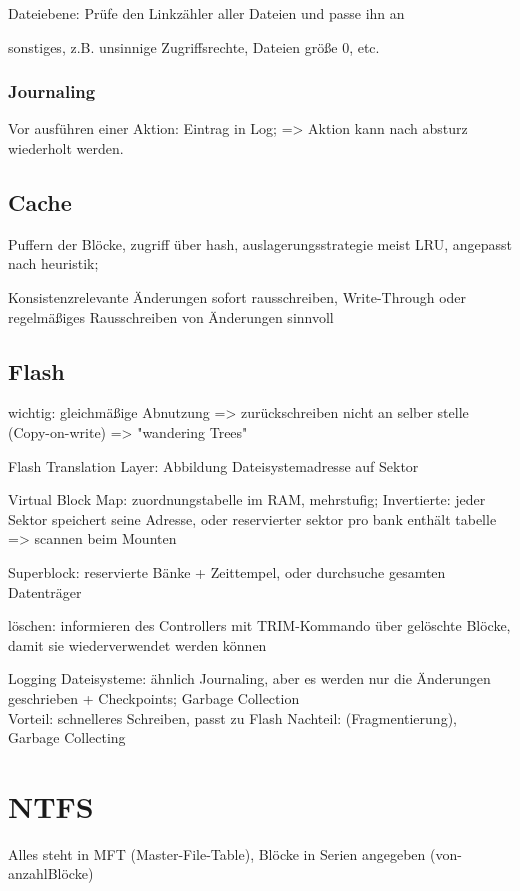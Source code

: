Dateiebene: Prüfe den Linkzähler aller Dateien und passe ihn an

sonstiges, z.B. unsinnige Zugriffsrechte, Dateien größe 0, etc.

\subsubsection*{Journaling}
Vor ausführen einer Aktion: Eintrag in Log; => Aktion kann nach absturz wiederholt werden.

\subsection*{Cache}
Puffern der Blöcke, zugriff über hash, auslagerungsstrategie meist LRU, angepasst nach heuristik;

Konsistenzrelevante Änderungen sofort rausschreiben, Write-Through oder regelmäßiges Rausschreiben von Änderungen sinnvoll

\subsection*{Flash}
wichtig: gleichmäßige Abnutzung => zurückschreiben nicht an selber stelle (Copy-on-write) => "wandering Trees"

Flash Translation Layer: Abbildung Dateisystemadresse auf Sektor

Virtual Block Map:  zuordnungstabelle im RAM, mehrstufig; 
Invertierte: jeder Sektor speichert seine Adresse, oder reservierter sektor pro bank enthält tabelle => scannen beim Mounten

Superblock: reservierte Bänke + Zeittempel, oder durchsuche gesamten Datenträger

löschen: informieren des Controllers mit TRIM-Kommando über gelöschte Blöcke, damit sie wiederverwendet werden können

Logging Dateisysteme: 
ähnlich Journaling, aber es werden nur die Änderungen geschrieben + Checkpoints; Garbage Collection\\
Vorteil: schnelleres Schreiben, passt zu Flash
Nachteil: (Fragmentierung), Garbage Collecting


\section*{NTFS}
Alles steht in MFT (Master-File-Table), Blöcke in Serien angegeben (von-anzahlBlöcke)
